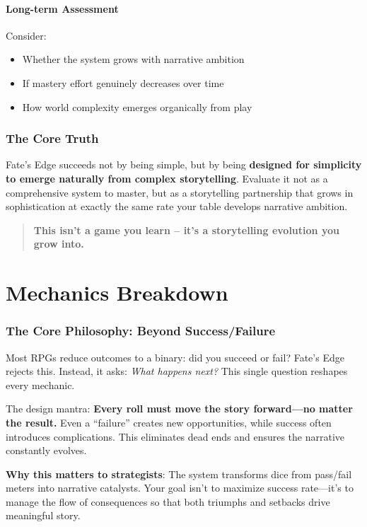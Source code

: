 \documentclass[11pt]{article}
\begin{document}
\subsection{Long-term Assessment}
Consider:
\begin{itemize}
    \item Whether the system grows with narrative ambition
    \item If mastery effort genuinely decreases over time
    \item How world complexity emerges organically from play
\end{itemize}

\section{The Core Truth}

Fate's Edge succeeds not by being simple, but by being \textbf{designed for simplicity to emerge naturally from complex storytelling}. Evaluate it not as a comprehensive system to master, but as a storytelling partnership that grows in sophistication at exactly the same rate your table develops narrative ambition.

\begin{quote}
\textbf{This isn't a game you learn -- it's a storytelling evolution you grow into.}
\end{quote}

\newpage

\part{Mechanics Breakdown}

\section{The Core Philosophy: Beyond Success/Failure}

Most RPGs reduce outcomes to a binary: did you succeed or fail? Fate's Edge rejects this. Instead, it asks: \textit{What happens next?} This single question reshapes every mechanic.

The design mantra: \textbf{Every roll must move the story forward---no matter the result.} Even a ``failure'' creates new opportunities, while success often introduces complications. This eliminates dead ends and ensures the narrative constantly evolves.

\textbf{Why this matters to strategists}: The system transforms dice from pass/fail meters into narrative catalysts. Your goal isn't to maximize success rate---it's to manage the flow of consequences so that both triumphs and setbacks drive meaningful story.
\end{document}
